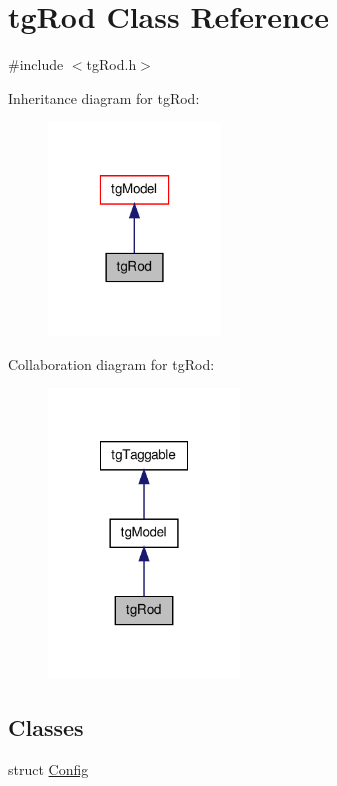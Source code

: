 \hypertarget{classtg_rod}{\section{tg\-Rod Class Reference}
\label{classtg_rod}
}


{\ttfamily \#include $<$tg\-Rod.\-h$>$}



Inheritance diagram for tg\-Rod\-:\nopagebreak
\begin{figure}[H]
\begin{center}
\leavevmode
\includegraphics[width=130pt]{classtg_rod__inherit__graph}
\end{center}
\end{figure}


Collaboration diagram for tg\-Rod\-:\nopagebreak
\begin{figure}[H]
\begin{center}
\leavevmode
\includegraphics[width=144pt]{classtg_rod__coll__graph}
\end{center}
\end{figure}
\subsection*{Classes}
\begin{DoxyCompactItemize}
\item 
struct \hyperlink{structtg_rod_1_1_config}{Config}
\end{DoxyCompactItemize}
